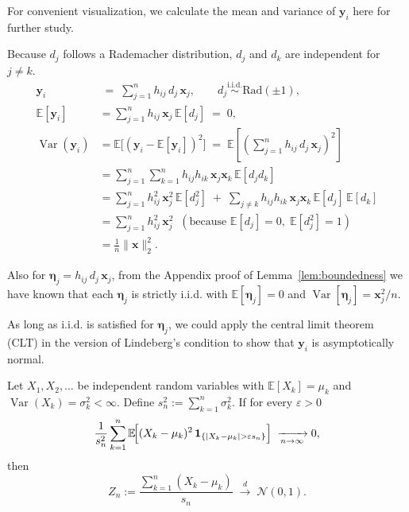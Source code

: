 \documentclass[11pt]{article}
\numberwithin{equation}{section}
\theoremstyle{plain}
\theoremstyle{definition}
\theoremstyle{remark}
\begin{document}
For convenient visualization, we calculate the mean and variance of $\mathbf{y}_{i}$ here for further study.

Because \( d_j \) follows a Rademacher distribution, \( d_j \) and \( d_k \) are independent for \( j \neq k \).
  \[
\begin{aligned}
\mathbf{y}_{i} & \;=\; \sum_{j=1}^{n} h_{ij}\,d_j\,\mathbf{x}_j, \qquad
     d_j \stackrel{\text{i.i.d.}}{\sim}\text{Rad}( \pm 1) ,\\[4pt]
\mathbb{E}[\mathbf{y}_{i}]
    &= \sum_{j=1}^{n} h_{ij}\,\mathbf{x}_j\,\mathbb{E}[d_j]
     \;=\; 0, \\[6pt]
\operatorname{Var}(\mathbf{y}_{i})
    &= \mathbb{E}\!\bigl[(\mathbf{y}_{i}-\mathbb{E}[\mathbf{y}_{i}])^{2}\bigr]
     \;=\; \mathbb{E}\!\left[\left(\sum_{j=1}^{n} h_{ij}\,d_j\,\mathbf{x}_j\right)^{\!2}\right] \\[4pt]
    &= \sum_{j=1}^{n}\sum_{k=1}^{n} h_{ij}h_{ik}\,\mathbf{x}_j\mathbf{x}_k\,\mathbb{E}[d_jd_k] \\[4pt]
    &= \sum_{j=1}^{n} h_{ij}^{2}\,\mathbf{x}_j^{2}\,\mathbb{E}[d_j^{2}]
     \;+\; \sum_{j\neq k} h_{ij}h_{ik}\,\mathbf{x}_j\mathbf{x}_k\,\mathbb{E}[d_j]\,\mathbb{E}[d_k] \\[4pt]
    &= \sum_{j=1}^{n} h_{ij}^{2}\,\mathbf{x}_j^{2}\;\;(\text{because } \mathbb{E}[d_j]=0,\;\mathbb{E}[d_j^{2}]=1) \\[6pt]
    &= \frac{1}{n} \|\mathbf{x}\|_2^2.
\end{aligned}
\]

Also for $\mathbf{\eta}_j = h_{ij}\,d_j\,\mathbf{x}_j$, from the Appendix proof of Lemma~\ref{lem:boundedness} we have known that each $\mathbf{\eta}_j$ is strictly i.i.d. with $\mathbb{E}[\mathbf{\eta}_j] = 0$ and $\operatorname{Var}[\mathbf{\eta}_j] = \mathbf{x}_j^2/n$.

As long as i.i.d. is satisfied for $\mathbf{\eta}_j$, we could apply the central limit theorem (CLT)  in the version of Lindeberg's condition to show that $\mathbf{y}_{i}$ is asymptotically normal.

\begin{thm}
  \label{thm:CLT}
    Let \(X_1,X_2,\dots\) be independent random variables with
    \(
    \mathbb{E}[X_k]=\mu_k
    \)
    and
    \(
    \operatorname{Var}(X_k)=\sigma_k^{2}<\infty
    \).
    Define
    \(
    s_n^{2}:=\sum_{k=1}^{n}\sigma_k^{2}.
    \)
    If for every \(\varepsilon>0\)
    \[
    \frac{1}{s_n^{2}}\sum_{k=1}^{n}
    \mathbb{E}\!\Bigl[(X_k-\mu_k)^{2}\,
    \mathbf 1_{\{|X_k-\mu_k|>\varepsilon s_n\}}\Bigr]
    \;\xrightarrow[n\to\infty]{}0,
    \]
    then
    \[
    Z_n:=\frac{\sum_{k=1}^{n}(X_k-\mu_k)}{s_n}
    \;\xrightarrow{\;d\;}\;
    \mathcal N(0,1).
    \]
    \end{thm}
\end{document}
